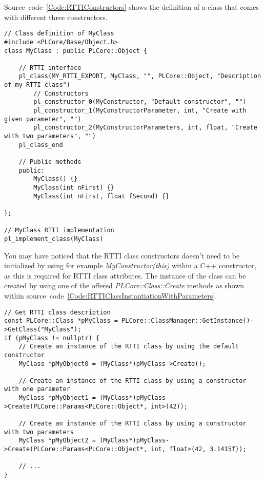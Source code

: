 Source~code~\ref{Code:RTTIConstructors} shows the definition of a class that comes with different three constructors.
\begin{lstlisting}[label=Code:RTTIConstructors,caption={RTTI class constructors with parameters}]
// Class definition of MyClass
#include <PLCore/Base/Object.h>
class MyClass : public PLCore::Object {

	// RTTI interface
	pl_class(MY_RTTI_EXPORT, MyClass, "", PLCore::Object, "Description of my RTTI class")
		// Constructors
		pl_constructor_0(MyConstructor, "Default constructor", "")
		pl_constructor_1(MyConstructorParameter, int, "Create with given parameter", "")
		pl_constructor_2(MyConstructorParameters, int, float, "Create with two parameters", "")
	pl_class_end

	// Public methods
	public:
		MyClass() {}
		MyClass(int nFirst) {}
		MyClass(int nFirst, float fSecond) {}

};

// MyClass RTTI implementation
pl_implement_class(MyClass)
\end{lstlisting}
You may have noticed that the RTTI class constructors doesn't need to be initialized by using for example \emph{MyConstructor(this)} within a C++ constructor, as this is required for RTTI class attributes. The instance of the class can be created by using one of the offered \emph{PLCore::Class::Create} methods as shown within source~code~\ref{Code:RTTIClassInstantiationWithParameters}.
\begin{lstlisting}[label=Code:RTTIClassInstantiationWithParameters,caption={RTTI class instantiation with parameters}]
// Get RTTI class description
const PLCore::Class *pMyClass = PLCore::ClassManager::GetInstance()->GetClass("MyClass");
if (pMyClass != nullptr) {
	// Create an instance of the RTTI class by using the default constructor
	MyClass *pMyObject0 = (MyClass*)pMyClass->Create();

	// Create an instance of the RTTI class by using a constructor with one parameter
	MyClass *pMyObject1 = (MyClass*)pMyClass->Create(PLCore::Params<PLCore::Object*, int>(42));

	// Create an instance of the RTTI class by using a constructor with two parameters
	MyClass *pMyObject2 = (MyClass*)pMyClass->Create(PLCore::Params<PLCore::Object*, int, float>(42, 3.1415f));

	// ...
}
\end{lstlisting}
